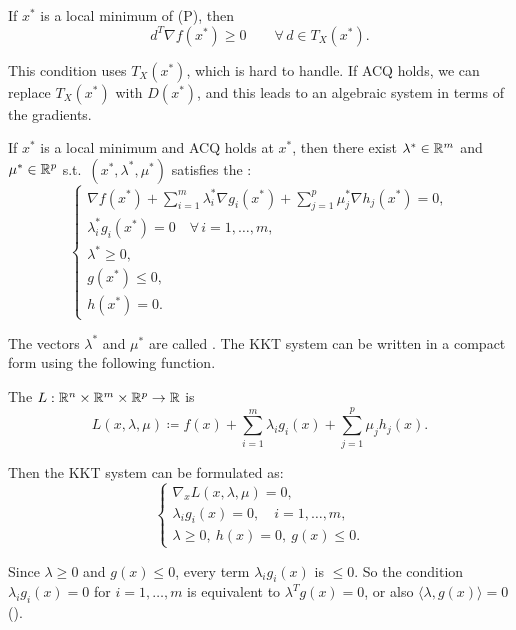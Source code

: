 \begin{lemma}
    If $x^*$ is a local minimum of (P), then
    \[
        d^T\nabla f(x^*) \ge 0 \qquad \forall\, d \in T_X(x^*).
    \]
\end{lemma}

This condition uses $T_X(x^*)$, which is hard to handle. If ACQ holds, we can replace $T_X(x^*)$ with $D(x^*)$, and this leads to an algebraic system in terms of the gradients.

\begin{theorem}
    \label{thm:kkt}
    If $x^*$ is a local minimum and ACQ holds at $x^*$, then there exist $\lambda^* \in \mathbb{R}^m$ and $\mu^* \in \mathbb{R}^p$ s.t.\ $(x^*, \lambda^*, \mu^*)$ satisfies the :
    \[
        \begin{cases}
            \nabla f(x^*) + \sum_{i=1}^{m} \lambda_i^* \nabla g_i(x^*) + \sum_{j=1}^{p} \mu_j^* \nabla h_j(x^*) = 0,\\
            \lambda_i^* g_i(x^*) = 0 \quad \forall\, i = 1, \dots, m,\\
            \lambda^* \ge 0,\\
            g(x^*) \le 0,\\
            h(x^*) = 0.
        \end{cases}
    \]
\end{theorem}

The vectors $\lambda^*$ and $\mu^*$ are called . The KKT system can be written in a compact form using the following function.

\begin{definition}
    The  $L : \mathbb{R}^n \times \mathbb{R}^m \times \mathbb{R}^p \to \mathbb{R}$ is
    \[
        L(x, \lambda, \mu) \coloneqq f(x) + \sum_{i=1}^{m} \lambda_i g_i(x) + \sum_{j=1}^{p} \mu_j h_j(x).
    \]
\end{definition}

Then the KKT system can be formulated as:
\[
    \begin{cases}
        \nabla_x L(x, \lambda, \mu) = 0,\\
        \lambda_i g_i(x) = 0, \quad i = 1, \dots, m,\\
        \lambda \ge 0,\ h(x) = 0,\ g(x) \le 0.
    \end{cases}
\]

\begin{remark}
    Since $\lambda \ge 0$ and $g(x) \le 0$, every term $\lambda_i g_i(x)$ is $\le 0$. So the condition $\lambda_i g_i(x) = 0$ for $i = 1, \dots, m$ is equivalent to $\lambda^T g(x) = 0$, or also $\langle \lambda, g(x) \rangle = 0$ ().
\end{remark}

